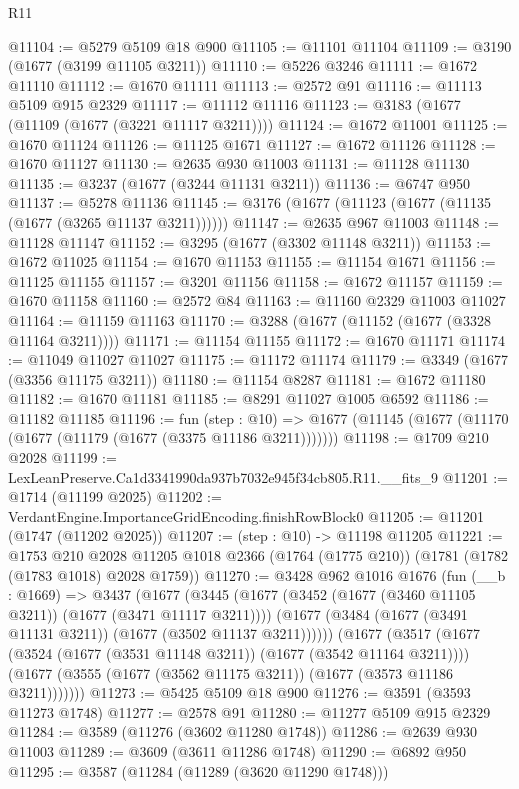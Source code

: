 \begin{lexlean}{R11}
\begin{coremodule}
@11104 := @5279 @5109 @18 @900
@11105 := @11101 @11104
@11109 := @3190 (@1677 (@3199 @11105 @3211))
@11110 := @5226 @3246
@11111 := @1672 @11110
@11112 := @1670 @11111
@11113 := @2572 @91
@11116 := @11113 @5109 @915 @2329
@11117 := @11112 @11116
@11123 := @3183 (@1677 (@11109 (@1677 (@3221 @11117 @3211))))
@11124 := @1672 @11001
@11125 := @1670 @11124
@11126 := @11125 @1671
@11127 := @1672 @11126
@11128 := @1670 @11127
@11130 := @2635 @930 @11003
@11131 := @11128 @11130
@11135 := @3237 (@1677 (@3244 @11131 @3211))
@11136 := @6747 @950
@11137 := @5278 @11136
@11145 := @3176 (@1677 (@11123 (@1677 (@11135 (@1677 (@3265 @11137 @3211))))))
@11147 := @2635 @967 @11003
@11148 := @11128 @11147
@11152 := @3295 (@1677 (@3302 @11148 @3211))
@11153 := @1672 @11025
@11154 := @1670 @11153
@11155 := @11154 @1671
@11156 := @11125 @11155
@11157 := @3201 @11156
@11158 := @1672 @11157
@11159 := @1670 @11158
@11160 := @2572 @84
@11163 := @11160 @2329 @11003 @11027
@11164 := @11159 @11163
@11170 := @3288 (@1677 (@11152 (@1677 (@3328 @11164 @3211))))
@11171 := @11154 @11155
@11172 := @1670 @11171
@11174 := @11049 @11027 @11027
@11175 := @11172 @11174
@11179 := @3349 (@1677 (@3356 @11175 @3211))
@11180 := @11154 @8287
@11181 := @1672 @11180
@11182 := @1670 @11181
@11185 := @8291 @11027 @1005 @6592
@11186 := @11182 @11185
@11196 := fun (step : @10) =>
  @1677 (@11145 (@1677 (@11170 (@1677 (@11179 (@1677 (@3375 @11186 @3211)))))))
@11198 := @1709 @210 @2028
@11199 := LexLeanPreserve.Ca1d3341990da937b7032e945f34cb805.R11.__fits_9
@11201 := @1714 (@11199 @2025)
@11202 := VerdantEngine.ImportanceGridEncoding.finishRowBlock0
@11205 := @11201 (@1747 (@11202 @2025))
@11207 := (step : @10) -> @11198 @11205
@11221 := @1753
    @210
    @2028
    @11205
    @1018
    @2366
    (@1764 (@1775 @210))
    (@1781 (@1782 (@1783 @1018) @2028 @1759))
@11270 := @3428
    @962
    @1016
    @1676
    (fun (__b : @1669) =>
    @3437
      (@1677
        (@3445
          (@1677 (@3452 (@1677 (@3460 @11105 @3211)) (@1677 (@3471 @11117 @3211))))
          (@1677 (@3484 (@1677 (@3491 @11131 @3211)) (@1677 (@3502 @11137 @3211))))))
      (@1677
        (@3517
          (@1677 (@3524 (@1677 (@3531 @11148 @3211)) (@1677 (@3542 @11164 @3211))))
          (@1677 (@3555 (@1677 (@3562 @11175 @3211)) (@1677 (@3573 @11186 @3211)))))))
@11273 := @5425 @5109 @18 @900
@11276 := @3591 (@3593 @11273 @1748)
@11277 := @2578 @91
@11280 := @11277 @5109 @915 @2329
@11284 := @3589 (@11276 (@3602 @11280 @1748))
@11286 := @2639 @930 @11003
@11289 := @3609 (@3611 @11286 @1748)
@11290 := @6892 @950
@11295 := @3587 (@11284 (@11289 (@3620 @11290 @1748)))

\end{coremodule}
\end{lexlean}
